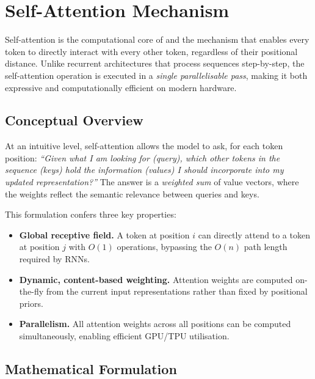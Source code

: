 
\section{Self-Attention Mechanism}
\label{sec:attention}

Self-attention is the computational core of \bert{} and the mechanism that enables
every token to directly interact with every other token, regardless of their positional
distance.  Unlike recurrent architectures that process sequences step-by-step, the
self-attention operation is executed in a \emph{single parallelisable pass}, making it
both expressive and computationally efficient on modern hardware.

\subsection{Conceptual Overview}
\label{subsec:attn_concept}

At an intuitive level, self-attention allows the model to ask, for each token
position: \emph{``Given what I am looking for (query), which other tokens in the
sequence (keys) hold the information (values) I should incorporate into my updated
representation?''}  The answer is a \emph{weighted sum} of value vectors, where
the weights reflect the semantic relevance between queries and keys.

This formulation confers three key properties:

\begin{itemize}
  \item \textbf{Global receptive field.}  A token at position $i$ can directly
        attend to a token at position $j$ with $O(1)$ operations, bypassing the
        $O(n)$ path length required by RNNs.

  \item \textbf{Dynamic, content-based weighting.}  Attention weights are computed
        on-the-fly from the current input representations rather than fixed by
        positional priors.

  \item \textbf{Parallelism.}  All attention weights across all positions can be
        computed simultaneously, enabling efficient GPU/TPU utilisation.
\end{itemize}

\subsection{Mathematical Formulation}
\label{subsec:attn_math}

